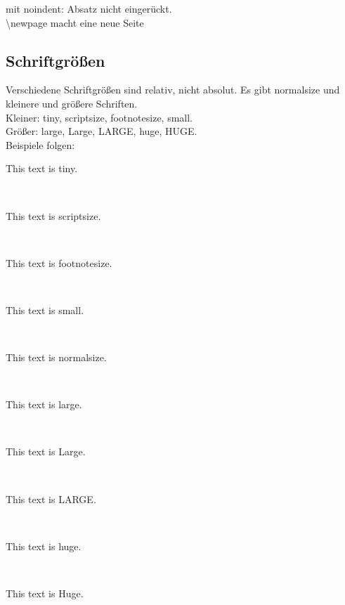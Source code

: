\noindent mit noindent: Absatz nicht eingerückt. \\

\textbackslash newpage macht eine neue Seite


\subsection{Schriftgrößen}


Verschiedene Schriftgrößen sind relativ, nicht absolut.
Es gibt normalsize und kleinere und größere Schriften. \\
Kleiner: tiny, scriptsize, footnotesize, small. \\
Größer: large, Large, LARGE, huge, HUGE. \\


\noindent Beispiele folgen: \\
\begin{tiny} This text is tiny. \end{tiny} \\
\begin{scriptsize} This text is scriptsize. \end{scriptsize} \\
\begin{footnotesize} This text is footnotesize. \end{footnotesize} \\
\begin{small} This text is small. \end{small} \\
\begin{normalsize} This text is normalsize. \end{normalsize} \\
\begin{large} This text is large. \end{large} \\
\begin{Large} This text is Large. \end{Large} \\
\begin{LARGE} This text is LARGE. \end{LARGE} \\
\begin{huge} This text is huge. \end{huge} \\
\begin{Huge} This text is Huge. \end{Huge} \\



